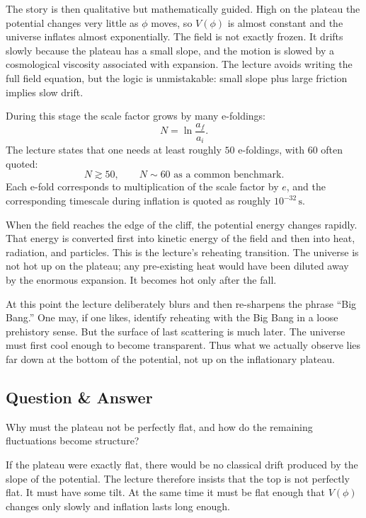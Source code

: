 The story is then qualitative but mathematically guided. High on the plateau the potential changes very little as \(\phi\) moves, so \(V(\phi)\) is almost constant and the universe inflates almost exponentially. The field is not exactly frozen. It drifts slowly because the plateau has a small slope, and the motion is slowed by a cosmological viscosity associated with expansion. The lecture avoids writing the full field equation, but the logic is unmistakable: small slope plus large friction implies slow drift.

During this stage the scale factor grows by many e-foldings:
\begin{equation}
N=\ln\frac{a_f}{a_i}.
\end{equation}
The lecture states that one needs at least roughly \(50\) e-foldings, with \(60\) often quoted:
\begin{equation}
N\gtrsim 50,
\qquad
N\sim 60 \text{ as a common benchmark.}
\end{equation}
Each e-fold corresponds to multiplication of the scale factor by \(e\), and the corresponding timescale during inflation is quoted as roughly \(10^{-32}\,\mathrm{s}\).

When the field reaches the edge of the cliff, the potential energy changes rapidly. That energy is converted first into kinetic energy of the field and then into heat, radiation, and particles. This is the lecture's reheating transition. The universe is not hot up on the plateau; any pre-existing heat would have been diluted away by the enormous expansion. It becomes hot only after the fall.

At this point the lecture deliberately blurs and then re-sharpens the phrase ``Big Bang.'' One may, if one likes, identify reheating with the Big Bang in a loose prehistory sense. But the surface of last scattering is much later. The universe must first cool enough to become transparent. Thus what we actually observe lies far down at the bottom of the potential, not up on the inflationary plateau.

\subsection{Question \& Answer}

Why must the plateau not be perfectly flat, and how do the remaining fluctuations become structure?

If the plateau were exactly flat, there would be no classical drift produced by the slope of the potential. The lecture therefore insists that the top is not perfectly flat. It must have some tilt. At the same time it must be flat enough that \(V(\phi)\) changes only slowly and inflation lasts long enough.


